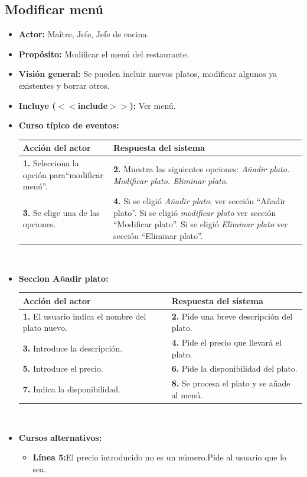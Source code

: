 \documentclass[spanish,a4paper,11pt, twoside]{report}	%
\begin{document}
		\subsection{Modificar menú}
			\begin{itemize}
			\item \textbf{Actor:} Maître, Jefe, Jefe de cocina.
			\item \textbf{Propósito:} Modificar el menú del restaurante.
			\item \textbf{Visión general:} Se pueden incluir nuevos platos, modificar algunos ya existentes y borrar otros.
			\item \textbf{Incluye ($<<$include$>>$):} Ver menú.
			\item \textbf{Curso típico de eventos:} 	\\
			\begin{tabular}{|p{6cm}||p{6cm}|}
				\hline
				\textbf{Acción del actor} & \textbf{Respuesta del sistema} \\ \hline \hline
				\textbf{1.} Selecciona la opción para``modificar menú''. & 
				\textbf{2.} Muestra las siguientes opciones: 
					\textit{Añadir plato. Modificar plato. Eliminar plato}. \\ \hline
				\textbf{3.} Se elige una de las opciones.	& 
				\textbf{4.} Si se eligió \textit{Añadir plato}, ver sección ``Añadir plato''. 
					Si se eligió \textit{modificar plato} ver sección ``Modificar plato''. 
					Si se eligió \textit{Eliminar plato} ver sección ``Eliminar plato''. \\ \hline
			\end{tabular}
			\\
			
			
			\item \textbf{Seccion Añadir plato:}  \\
					\begin{tabular}{|p{6cm}||p{6cm}|}
					\hline
					\textbf{Acción del actor} & \textbf{Respuesta del sistema} \\ \hline \hline
					\textbf{1.} El usuario indica el nombre del plato nuevo. & 
					\textbf{2.} Pide una breve descripción del plato. \\ \hline
					\textbf{3.} Introduce la descripción.	& 
					\textbf{4.} Pide el precio que llevará el plato. \\ \hline
					\textbf{5.} Introduce el precio. & 
					\textbf{6.} Pide la disponibilidad del plato. \\ \hline
					\textbf{7.} Indica la disponibilidad. & 
					\textbf{8.} Se procesa el plato y se añade al menú. \\ \hline
				\end{tabular}
			\\
			\item \textbf{Cursos alternativos:} 
			\begin{itemize}
				\item  \textbf{Línea 5:}El precio introducido no es un número.Pide al usuario que lo sea.
			\end {itemize}
			

\end{itemize}
\end{document}
